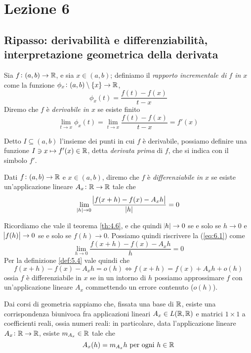 \section{Lezione 6}
\subsection{Ripasso: derivabilità e differenziabilità, interpretazione geometrica della derivata}
\begin{definition}
    \label{def:6.1}
    Sia $f\colon(a,b)\to\amsbb{R}$, e sia $x\in(a,b)$; definiamo il \emph{rapporto incrementale di $f$ in $x$} come la funzione $\phi_x \colon (a,b) \setminus \{x\} \to \amsbb{R}$,
    \[
    \phi_x(t) = \frac{f(t)-f(x)}{t-x}
    \]
    Diremo che $f$ è \emph{derivabile in $x$} se esiste finito
    \begin{equation}
        \label{eq:6.1}
        \lim_{t\to x} \phi_x(t) = \lim_{t\to x} \frac{f(t)-f(x)}{t-x} = f'(x)
    \end{equation}
\end{definition}
\begin{remark}
    Detto $I\subseteq (a,b)$ l'insieme dei punti in cui $f$ è derivabile, possiamo definire una funzione $ I\ni x \mapsto f'(x)\in \amsbb{R}$, detta \emph{derivata prima} di $f$, che si indica con il simbolo $f'$.
\end{remark}
\begin{definition}
    \label{def:6.2}
    Dati $f\colon(a,b)\to\amsbb{R}$ e $x\in(a,b)$, diremo che $f$ è \emph{differenziabile in $x$} se esiste un'applicazione lineare $A_x\colon\amsbb{R}\to \amsbb{R}$ tale che
    \begin{equation}
        \label{eq:6.2}
        \lim_{\abs{h}\to0}\frac{\abs{f(x+h)-f(x)-A_x h}}{\abs{h}}=0
    \end{equation}
\end{definition}
\begin{remark}
    Ricordiamo che vale il teorema \ref{th:4.6}, e che quindi $\abs{h}\to 0$ se e solo se $h\to0$ e $\abs{f(h)}\to0$ se e solo se $f(h)\to0$. Possiamo quindi riscrivere la (\ref{eq:6.1}) come
    \[
    \lim_{h\to 0} \frac{f(x+h)-f(x)-A_x h}{h}=0
    \]
    Per la definizione \ref{def:5.4} vale quindi che
    \[
    f(x+h)-f(x)-A_xh = o(h) \iff f(x+h) = f(x) + A_x h+o(h)
    \]
    ossia $f$ è differenziabile in $x$ se in un intorno di $h$ possiamo approssimare $f$ con un'applicazione lineare $A_x$ commettendo un errore contenuto ($o(h)$).
\end{remark}
\begin{remark}
    Dai corsi di geometria sappiamo che, fissata una base di $\amsbb{R}$, esiste una corrispondenza biunivoca fra applicazioni lineari $A_x\in L(\amsbb{R}, \amsbb{R})$ e matrici $1\times 1$ a coefficienti reali, ossia numeri reali: in particolare, data l'applicazione lineare $A_x\colon \amsbb{R}\to\amsbb{R}$, esiste $m_{A_x}\in\amsbb{R}$ tale che
    \[
    A_x(h) = m_{A_x}h \ \text{per ogni} \ h\in\amsbb{R}
    \]
\end{remark}
